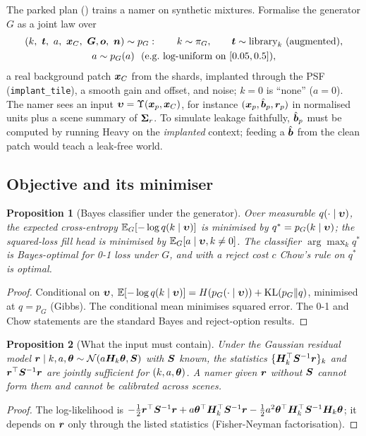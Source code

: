 \documentclass[11pt,a4paper]{article}
\theoremstyle{plain}
\newtheorem{proposition}{Proposition}[section]
\theoremstyle{definition}
\theoremstyle{remark}
\newcommand{\E}{\mathbb{E}}
\newcommand{\x}{\B{x}}
\newcommand{\bh}{\hat{\B{b}}}
\newcommand{\tv}{\B{t}}
\newcommand{\rv}{\B{r}}
\newcommand{\nv}{\B{n}}
\newcommand{\Sm}{\B{S}}
\newcommand{\Hm}{\B{H}}
\newcommand{\Gm}{\B{G}}
\begin{document}
The parked plan () trains a namer on synthetic mixtures. Formalise the generator $G$ as a
joint law over
\begin{gather*}
  (k,\ \tv,\ a,\ \x_{C},\ \Gm,\B o,\ \nv)\sim p_G:\qquad
  k\sim\pi_G,\qquad \tv\sim\text{library}_k\ (\text{augmented}),\\
  a\sim p_G(a)\ \ (\text{e.g.\ log-uniform on }[0.05,0.5]),
\end{gather*}
a real background patch $\x_C$ from the shards, implanted through the PSF (\verb|implant_tile|), a smooth gain and offset, and
noise; $k=0$ is ``none'' ($a=0$). The namer sees an input $\B\upsilon=\Upsilon(\x_p,\x_C)$, for instance
$(\x_p,\bh_p,\rv_p)$ in normalised units plus a scene summary of $\bm{\Sigma}_r$. To simulate leakage faithfully, $\bh_p$ must be
computed by running Heavy on the \emph{implanted} context; feeding a $\bh$ from the clean patch would teach a leak-free world.

\subsection{Objective and its minimiser}

\begin{proposition}[Bayes classifier under the generator]
\label{prop:bayes}
Over measurable $q(\cdot\mid\bm{\upsilon})$, the expected cross-entropy $\E_G[-\log q(k\mid\B\upsilon)]$ is minimised by
$q^\ast=p_G(k\mid\bm{\upsilon})$; the squared-loss fill head is minimised by $\E_G[a\mid\B\upsilon,k\neq0]$. The classifier
$\arg\max_kq^\ast$ is Bayes-optimal for 0-1 loss under $G$, and with a reject cost $c$ Chow's rule on $q^\ast$ is optimal.
\end{proposition}
\begin{proof}
Conditional on $\bm{\upsilon}$, $\E[-\log q(k\mid\B\upsilon)]=H(p_G(\cdot\mid\B\upsilon))+\mathrm{KL}(p_G\|q)$, minimised at $q=p_G$
(Gibbs). The conditional mean minimises squared error. The 0-1 and Chow statements are the standard Bayes and reject-option
results.
\end{proof}

\begin{proposition}[What the input must contain]
\label{prop:suff}
Under the Gaussian residual model $\rv\mid k,a,\B\theta\sim\mathcal N(a\Hm_k\B\theta,\Sm)$ with $\Sm$ known, the statistics
$\{\Hm_k^\top\Sm^{-1}\rv\}_k$ and $\rv^\top\Sm^{-1}\rv$ are jointly sufficient for $(k,a,\bm{\theta})$. A namer given $\rv$ without
$\Sm$ cannot form them and cannot be calibrated across scenes.
\end{proposition}
\begin{proof}
The log-likelihood is $-\tfrac12\rv^\top\Sm^{-1}\rv+a\B\theta^\top\Hm_k^\top\Sm^{-1}\rv-\tfrac12a^2\B\theta^\top\Hm_k^\top\Sm^{-1}\Hm_k\B\theta$;
it depends on $\rv$ only through the listed statistics (Fisher-Neyman factorisation).
\end{proof}
\end{document}
